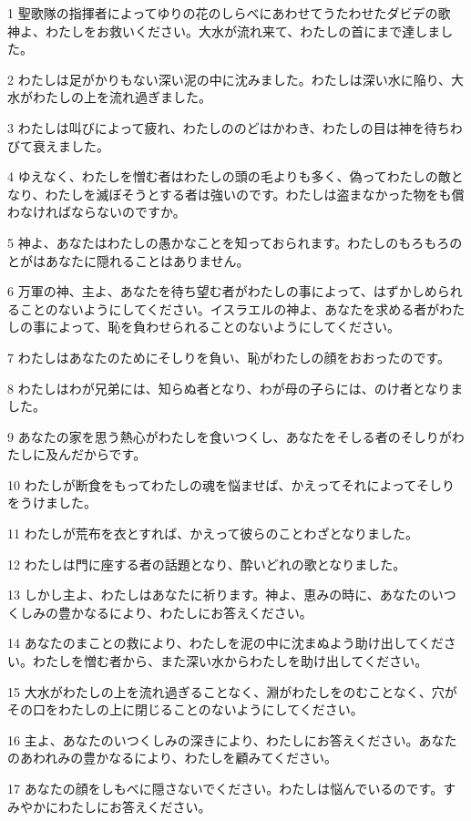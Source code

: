 \par 1 聖歌隊の指揮者によってゆりの花のしらべにあわせてうたわせたダビデの歌 神よ、わたしをお救いください。大水が流れ来て、わたしの首にまで達しました。
\par 2 わたしは足がかりもない深い泥の中に沈みました。わたしは深い水に陥り、大水がわたしの上を流れ過ぎました。
\par 3 わたしは叫びによって疲れ、わたしののどはかわき、わたしの目は神を待ちわびて衰えました。
\par 4 ゆえなく、わたしを憎む者はわたしの頭の毛よりも多く、偽ってわたしの敵となり、わたしを滅ぼそうとする者は強いのです。わたしは盗まなかった物をも償わなければならないのですか。
\par 5 神よ、あなたはわたしの愚かなことを知っておられます。わたしのもろもろのとがはあなたに隠れることはありません。
\par 6 万軍の神、主よ、あなたを待ち望む者がわたしの事によって、はずかしめられることのないようにしてください。イスラエルの神よ、あなたを求める者がわたしの事によって、恥を負わせられることのないようにしてください。
\par 7 わたしはあなたのためにそしりを負い、恥がわたしの顔をおおったのです。
\par 8 わたしはわが兄弟には、知らぬ者となり、わが母の子らには、のけ者となりました。
\par 9 あなたの家を思う熱心がわたしを食いつくし、あなたをそしる者のそしりがわたしに及んだからです。
\par 10 わたしが断食をもってわたしの魂を悩ませば、かえってそれによってそしりをうけました。
\par 11 わたしが荒布を衣とすれば、かえって彼らのことわざとなりました。
\par 12 わたしは門に座する者の話題となり、酔いどれの歌となりました。
\par 13 しかし主よ、わたしはあなたに祈ります。神よ、恵みの時に、あなたのいつくしみの豊かなるにより、わたしにお答えください。
\par 14 あなたのまことの救により、わたしを泥の中に沈まぬよう助け出してください。わたしを憎む者から、また深い水からわたしを助け出してください。
\par 15 大水がわたしの上を流れ過ぎることなく、淵がわたしをのむことなく、穴がその口をわたしの上に閉じることのないようにしてください。
\par 16 主よ、あなたのいつくしみの深きにより、わたしにお答えください。あなたのあわれみの豊かなるにより、わたしを顧みてください。
\par 17 あなたの顔をしもべに隠さないでください。わたしは悩んでいるのです。すみやかにわたしにお答えください。
